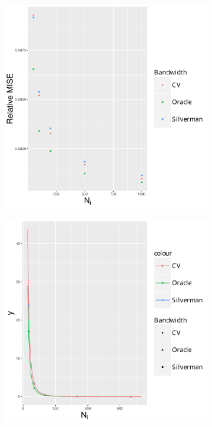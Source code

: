 \begin{figure}[htbp]
\begin{subfigure}[b]{0.24\textwidth}
        \includegraphics[width=\textwidth]{results/by_pop_size/RMISE-vs-population}
        \caption{}
        \label{fig:ise:unifNpop_1h:rmise}
    \end{subfigure}
    \begin{subfigure}[b]{0.24\textwidth}
        \includegraphics[width=\textwidth]{results/by_pop_size/NMISE-vs-population}

\end{subfigure}
\end{figure}
